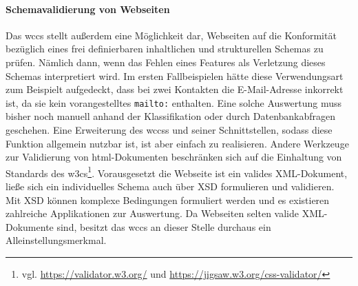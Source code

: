        \paragraph{Schemavalidierung von Webseiten}
        Das \gls{wccs} stellt außerdem eine Möglichkeit dar,
        Webseiten auf die Konformität bezüglich eines frei definierbaren
        inhaltlichen und strukturellen Schemas zu prüfen.
        Nämlich dann, wenn das Fehlen eines Features als Verletzung
        dieses Schemas interpretiert wird.
        Im ersten Fallbeispielen hätte diese Verwendungsart zum Beispielt aufgedeckt,
        dass bei zwei Kontakten die E-Mail-Adresse inkorrekt ist,
        da sie kein vorangestelltes \texttt{mailto:} enthalten.
        Eine solche Auswertung muss bisher noch manuell anhand der Klassifikation
        oder durch Datenbankabfragen geschehen.
        Eine Erweiterung des \glspl{wccs} und seiner Schnittstellen,
        sodass diese Funktion allgemein nutzbar ist,
        ist aber einfach zu realisieren.
        Andere Werkzeuge zur Validierung von \gls{html}-Dokumenten
        beschränken sich auf die Einhaltung von Standards des
        \glspl{w3c}\footnote{vgl. \url{https://validator.w3.org/} und \url{https://jigsaw.w3.org/css-validator/}}.
        Vorausgesetzt die Webseite ist ein valides XML-Dokument,
        ließe sich ein individuelles Schema auch über XSD formulieren und validieren.
        Mit XSD können komplexe Bedingungen formuliert werden und es existieren
        zahlreiche Applikationen zur Auswertung.
        Da Webseiten selten valide XML-Dokumente sind,
        besitzt das \gls{wccs} an dieser Stelle durchaus
        ein Alleinstellungsmerkmal.
